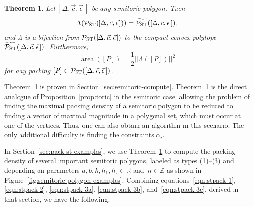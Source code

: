 \documentclass[pdftex]{sigma}
\numberwithin{equation}{section}
\newtheorem{Theorem}{Theorem}[section]
\def\R{{\mathbb R}}
\def\Z{{\mathbb Z}}
\newcommand{\De}{\Delta}
\newcommand{\area}{\operatorname{area}}
\newcommand{\PST}{\mathcal{P}_{\rm ST}}
\newcommand{\PSTtilde}{\widetilde{\mathcal{P}_{\rm ST}}}
\newcommand{\stpoly}{[\De,\vec{c},\vec{\epsilon}\,]}
\begin{document}
\begin{Theorem}\label{thm:semitoric}
 Let $\stpoly$ be any semitoric polygon. Then
 \[
 \Lambda(\PST(\stpoly)) = \PSTtilde(\stpoly),
 \]
 and $\Lambda$ is a bijection from $\PST(\stpoly)$ to the compact convex polytope $\PSTtilde(\stpoly)$.
 Furthermore,
 \[
 \area([P]) = \frac{1}{2}||\Lambda([P])||^2
 \]
 for any packing $[P]\in\PST(\stpoly)$.
\end{Theorem}

Theorem~\ref{thm:semitoric} is proven in Section~\ref{sec:semitoric-compute}. Theorem~\ref{thm:semitoric} is the direct analogue of Proposition~\ref{prop:toric} in the semitoric case, allowing the problem of finding the maximal packing density of a semitoric polygon to be reduced to finding a vector of maximal magnitude in a polygonal set, which must occur at one of the vertices. Thus, one can also obtain an algorithm in this scenario. The only additional difficulty is finding the constraints $\alpha_i$.

In Section~\ref{sec:pack-st-examples}, we use Theorem~\ref{thm:semitoric} to compute the packing density of several important semitoric polygons,
labeled as types (1)--(3) and depending on parameters $a,b, h, h_1, h_2\in\R$ and~$n\in\Z$ as shown in Figure~\ref{fig:semitoric-polygon-examples}.
Combining equations~\eqref{eqn:stpack-1}, \eqref{eqn:stpack-2}, \eqref{eqn:stpack-3a}, \eqref{eqn:stpack-3b}, and~\eqref{eqn:stpack-3c}, derived in that section, we have the following.
\end{document}
